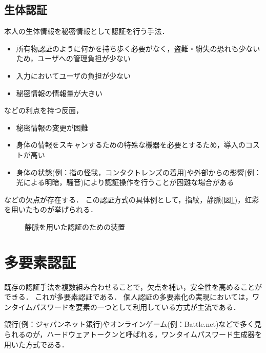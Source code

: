 \subsection{生体認証}\label{subsec:inherence}
本人の生体情報を秘密情報として認証を行う手法．
\begin{itemize}
\item 所有物認証のように何かを持ち歩く必要がなく，盗難・紛失の恐れも少ないため，ユーザへの管理負担が少ない
\item 入力においてユーザの負担が少ない
\item 秘密情報の情報量が大きい
\end{itemize}
などの利点を持つ反面，
\begin{itemize}
\item 秘密情報の変更が困難
\item 身体の情報をスキャンするための特殊な機器を必要とするため，導入のコストが高い
\item 身体の状態(例：指の怪我，コンタクトレンズの着用)や外部からの影響(例：光による明暗，騒音)により認証操作を行うことが困難な場合がある
\end{itemize}
などの欠点が存在する．
この認証方式の具体例として，指紋，静脈(図\ref{fig:veinAuth})，虹彩を用いたものが挙げられる．

\begin{figure}[th]
\begin{center}
\end{center}
\caption{静脈を用いた認証のための装置}
\label{fig:veinAuth}
\end{figure}

\section{多要素認証}\label{sec:2factor}


既存の認証手法を複数組み合わせることで，欠点を補い，安全性を高めることができる．
これが多要素認証である．
個人認証の多要素化の実現においては，ワンタイムパスワードを要素の一つとして利用している方式が主流である\cite{DBLP:journals/corr/CristofaroDFN13}．

銀行(例：ジャパンネット銀行\cite{japannet2F})やオンラインゲーム(例：Battle.net\cite{battlenet2F})などで多く見られる\cite{DBLP:journals/corr/CristofaroDFN13}\cite{Yamane:2011:SOG:2021672.2021743}のが，ハードウェアトークンと呼ばれる，ワンタイムパスワード生成器を用いた方式である．

